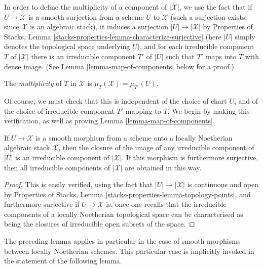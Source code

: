 \medskip\noindent
In order to define the multiplicity of a component of $|\mathcal{X}|$,
we use the fact that if $U \to \mathcal{X}$ is a smooth surjection
from a scheme $U$ to $\mathcal{X}$ (such a surjection exists,
since $\mathcal{X}$ is an algebraic stack), it induces a surjection
$|U| \to |\mathcal{X}|$ by
Properties of Stacks, Lemma
\ref{stacks-properties-lemma-characterize-surjective}
(here $|U|$ simply denotes the topological
space underlying $U$), and for each irreducible component
$T$ of $|\mathcal{X}|$ there is an irreducible component $T'$ of
$|U|$ such that $T'$ maps into $T$ with dense image.
(See Lemma \ref{lemma-map-of-components} below for a proof.)

\begin{definition}
\label{definition-multiplicity}
The {\it multiplicity} of $T$ in $\mathcal{X}$ is
$\mu_T(\mathcal{X}) = \mu_{T'}(U)$.
\end{definition}

\noindent
Of course, we must check that this is independent
of the choice of chart $U$, and of the choice
of irreducible component $T'$ mapping to $T$.
We begin by making this verification, as well as
proving Lemma \ref{lemma-map-of-components}.

\begin{lemma}
\label{lemma-map-of-components}
If $U \to \mathcal{X}$ is a smooth morphism from a scheme
onto a locally Noetherian algebraic stack $\mathcal{X}$, then the closure of
the image of any irreducible
component of $|U|$ is an irreducible component of $|\mathcal{X}|$.
If this morphism is furthermore surjective,
then all irreducible components of $|\mathcal{X}|$ are obtained in this way.
\end{lemma}

\begin{proof}
This is easily verified, using the fact that $|U| \to |\mathcal{X}|$ is
continuous and open by
Properties of Stacks, Lemma
\ref{stacks-properties-lemma-topology-points},
and furthermore surjective if $U \to \mathcal{X}$ is,
once one recalls that the irreducible components of a locally
Noetherian topological space can be
characterised as being the closures of irreducible open subsets of the space.
\end{proof}

\noindent
The preceding lemma applies in particular in the case of smooth morphisms
between locally Noetherian schemes.    This particular case is
implicitly invoked in the statement of the following lemma.

